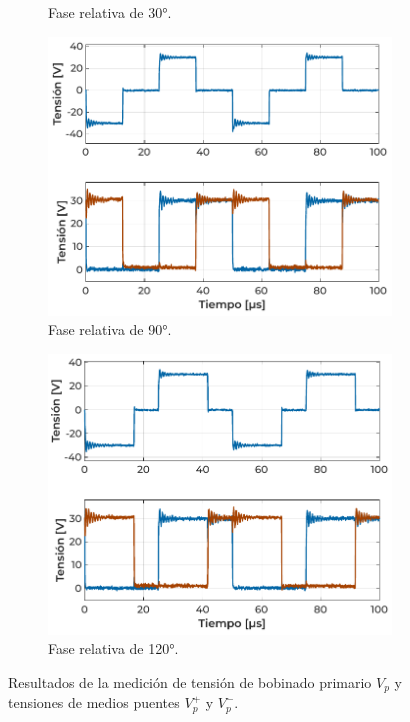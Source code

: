 \begin{figure}[h]
\begin{subfigure}{0.47\textwidth}
        \caption{Fase relativa de 30°.}
        \label{fig:ensayo_sincarga30}
    \end{subfigure}
    \hfill\vspace{1em}
    \begin{subfigure}{0.47\textwidth}
        \centering
        \includegraphics[width=\textwidth]{Imagenes/Sin Carga - Fase 90.pdf}
        \caption{Fase relativa de 90°.}
        \label{fig:ensayo_sincarga90}
    \end{subfigure}
    \hspace{0.5em}
    \begin{subfigure}{0.47\textwidth}
        \centering
        \includegraphics[width=\textwidth]{Imagenes/Sin Carga - Fase 120.pdf}
        \caption{Fase relativa de 120°.}
        \label{fig:ensayo_sincarga120}
    \end{subfigure}
    \caption{Resultados de la medición de tensión de bobinado primario $V_p$ y tensiones de medios puentes $V_p^+$ y $V_p^-$.}
    \label{fig:ensayo_sincarga}
\end{figure}

